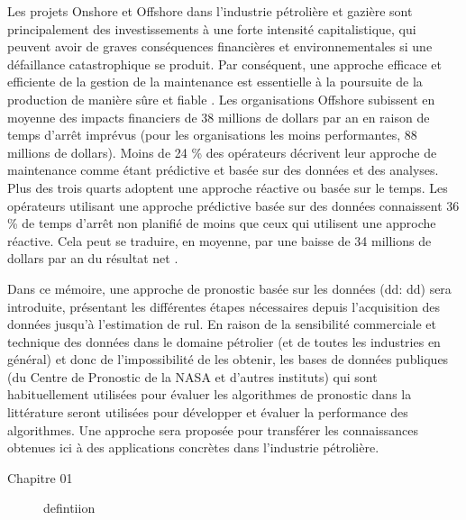 Les projets Onshore et Offshore dans l'industrie pétrolière et gazière sont principalement des investissements à une forte intensité capitalistique, qui peuvent avoir de graves conséquences financières et environnementales si une défaillance catastrophique se produit. Par conséquent, une approche efficace et efficiente de la gestion de la maintenance est essentielle à la poursuite de la production de manière sûre et fiable \cite{Telford2011}. Les organisations Offshore subissent en moyenne des impacts financiers de 38 millions de dollars par an en raison de temps d'arrêt imprévus (pour les organisations les moins performantes, 88 millions de dollars). Moins de 24 \% des opérateurs décrivent leur approche de maintenance comme étant prédictive et basée sur des données et des analyses. Plus des trois quarts adoptent une approche réactive ou basée sur le temps. Les opérateurs utilisant une approche prédictive basée sur des données connaissent 36 \% de temps d'arrêt non planifié de moins que ceux qui utilisent une approche réactive. Cela peut se traduire, en moyenne, par une baisse de 34 millions de dollars par an du résultat net \cite{Eriksen2016}.

Dans ce mémoire, une approche de pronostic basée sur les données (\acrlong{dd}: \acrshort{dd}) sera introduite, présentant les différentes étapes nécessaires depuis l'acquisition des données jusqu'à l'estimation de \acrshort{rul}. En raison de la sensibilité commerciale et technique des données dans le domaine pétrolier (et de toutes les industries en général) et donc de l'impossibilité de les obtenir, les bases de données publiques (du Centre de Pronostic de la NASA et d'autres instituts) qui sont habituellement utilisées pour évaluer les algorithmes de pronostic dans la littérature seront utilisées pour développer et évaluer la performance des algorithmes. Une approche sera proposée pour transférer les connaissances obtenues ici à des applications concrètes dans l'industrie pétrolière.
\newline
\begin{description}
	\item[Chapitre 01] defintiion
\end{description}




